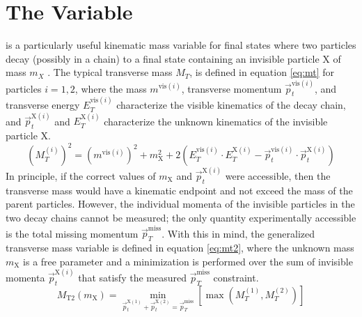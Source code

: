 \section{The \texorpdfstring{\mttwo} VVariable}
\label{sec:mt2}
\mttwo is a particularly useful kinematic mass variable for final states where two particles decay (possibly in a chain) to a final state containing an invisible particle X of mass $m_X$ \cite{Lester:1999tx}. The typical transverse mass $M_T$, is defined in equation \ref{eq:mt} for particles $i=1,2$, where the mass $m^{\text{vis}(i)}$, transverse momentum $\vec{p}_t^{\text{vis}(i)}$, and transverse energy $E_T^{\text{vis}(i)}$ characterize the visible kinematics of the decay chain, and $\vec{p}_t^{\text{X}(i)}$ and $E_T^{\text{X}(i)}$ characterize the unknown kinematics of the invisible particle X.
\begin{equation}
	(M_T^{(i)})^2 = (m^{\text{vis}(i)})^2 + m_{\text{X}}^2+2\left(E_T^{\text{vis}(i)} \cdot E_T^{\text{X}(i)} - \vec{p}_t^{\text{vis}(i)} \cdot \vec{p}_t^{\text{X}(i)} \right)
	\label{eq:mt}
\end{equation}
In principle, if the correct values of $m_{\text{X}}$ and $\vec{p}_t^{\text{X}(i)}$ were accessible, then the transverse mass would have a kinematic endpoint and not exceed the mass of the parent particles. However, the individual momenta of the invisible particles in the two decay chains cannot be measured; the only quantity experimentally accessible is the total missing momentum $\vec{p}_T^{\text{miss}}$. With this in mind, the generalized transverse mass variable \mttwo is defined in equation \ref{eq:mt2}, where the unknown mass $m_{\text{X}}$ is a free parameter and a minimization is performed over the sum of invisible momenta $\vec{p}_t^{\text{X}(i)}$ that satisfy the measured $\vec{p}_T^{\text{miss}}$ constraint.
\begin{equation}
	M_{\text{T2}}(m_{\text{X}}) = \min_{\vec{p}_t^{\text{X}(1)}+\vec{p}_t^{\text{X}(2)}=\vec{p}_T^{\text{miss}}} \left[\max \left( M_T^{(1)},M_T^{(2)} \right) \right]
	\label{eq:mt2}
\end{equation}

